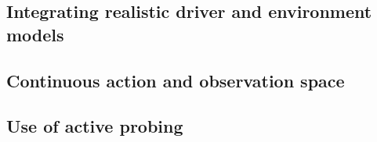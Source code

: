 \subsection{Integrating realistic driver and environment models}
\subsection{Continuous action and observation space}
\label{sec:conclusion-continuous}





\subsection{Use of active probing}




